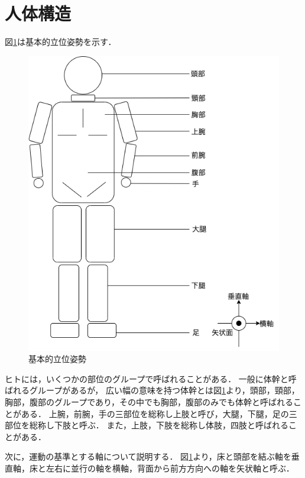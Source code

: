 \section{人体構造}
図\ref{基本的立位姿勢}は基本的立位姿勢を示す．
\begin{figure}
    \begin{center}
        \includegraphics[width=1.0\linewidth]{./images/human_body.png}
        \caption{基本的立位姿勢}
        \label{基本的立位姿勢}
    \end{center}
\end{figure}
ヒトには，いくつかの部位のグループで呼ばれることがある．
一般に体幹と呼ばれるグループがあるが，
広い幅の意味を持つ体幹とは図\ref{基本的立位姿勢}より，頭部，頸部，胸部，腹部のグループであり，その中でも胸部，腹部のみでも体幹と呼ばれることがある．
上腕，前腕，手の三部位を総称し上肢と呼び，大腿，下腿，足の三部位を総称し下肢と呼ぶ．
また，上肢，下肢を総称し体肢，四肢と呼ばれることがある．

次に，運動の基準とする軸について説明する．
図\ref{基本的立位姿勢}より，床と頭部を結ぶ軸を垂直軸，床と左右に並行の軸を横軸，背面から前方方向への軸を矢状軸と呼ぶ．


